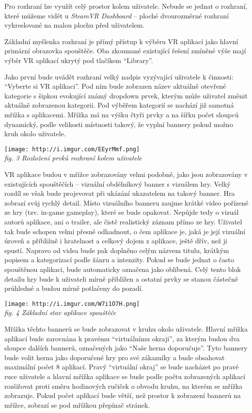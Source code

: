 Pro rozhraní lze využít celý prostor kolem uživatele. Nebude se jednat o
rozhraní, které můžeme vidět u \emph{SteamVR Dashboard} -- ploché
dvourozměrné rozhraní vykreslované na malou plochu před uživatelem.

Základní myšlenka rozhraní je přímý přístup k výběru VR aplikací jako
hlavní primární obrazovka spouštěče. Oba zkoumané existující řešení
zmíněné výše mají výběr VR aplikací ukrytý pod tlačíkem ``Library''.

Jako první bude uvádět rozhraní velký nadpis vyzývající uživatele k
činnosti: ``Vyberte si VR aplikaci''. Pod ním bude zobrazen název
aktuálně otevřené kategorie s šipkou evokující známý dropdown prvek,
kterým může uživatel změnit aktuálně zobrazenou kategorii. Pod výběřem
kategorií se nachází již samotná mřížka s aplikacemi. Mřížka má na výšku
čtyři prvky a na šířku počet sloupců dynamický, podle velikosti
místnosti takový, že vyplní bannery pokud možno kruh okolo uživatele.

\texttt{[image: http://i.imgur.com/EEyrMmf.png]}\\
\emph{fig. 3 Rozložení prvků rozhraní kolem uživatele}

VR aplikace budou v mřížce zobrazovány velmi podobně, jako jsou
zobrazovány v existujících spouštěčích -- vizuální obdélníkový banner s
vizuálem hry. Velký rozdíl se však bude projevovat při ukázání
ukazatelem na takový banner. Hra zobrazí svůj rychlý detail. Místo
vizuálního banneru zaujme krátké video pořízené ze hry (tzv. in-game
gameplay), které se bude opakovat. Nepůjde tedy o vizuál autorů
aplikace, ani o trailer, ale čistě realistický záznam přímo ze hry.
Uživatel tak bude schopen velmi přesně odhadnout, o čem aplikace je,
jaká je její vizuální úroveň a přibližně i hratelnost a celkový dojem z
aplikace, ještě dřív, než ji spustí. Napravo od videa bude pak doplněno
celým názvem titulu, krátkým popisem a kategorizací podle žánru a
intenzity. Pokud se bude jednat o často spouštěnou aplikaci, bude
automaticky označena jako oblíbená. Celý tento blok detailu hry bude k
uživateli mírně přiblížen a ostatní prvky se stanou částečně průhledné a
budou mírně potlačeny do pozadí.

\texttt{[image: http://i.imgur.com/W7i1O7H.png]}\\
\emph{fig. 4 Základní stav aplikace spouštěče}

Mřížka těchto bannerů se bude zobrazovat v kruhu okolo uživatele. Hlavní
mřížka aplikací bude zarovnána k pravému ``virtuálnímu okraji'', za
kterým budou dva sloupce dalších bannerů, označených jako ``Naše herna
doporučuje''. Tyto bannery bude volit herna jako doporučené hry pro své
zákazníky a bude obsahovat maximální počet 8 aplikací. Pravý ``virtuální
okraj'' se bude nacházet po pravé ruce uživatele a hlavní mřížka
aplikace se bude podle počtu zobrazených aplikací rozšiřovat proti směru
hodinových ručiček o obvodu kruhu, na kterém se mřížka zobrazuje. Pokud
počet aplikací bude větší, než prostor k zobrazení bannerů na mřížce,
zobrazí se pod mřížkou přepínač stránek.

